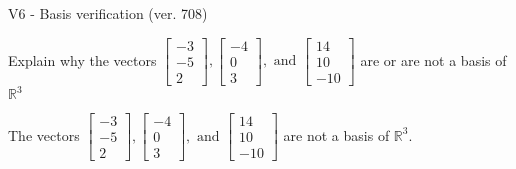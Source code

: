 \begin{exercise}
  \begin{exerciseTitle}V6 - Basis verification (ver. 708)\end{exerciseTitle}
  \begin{exerciseStatement}
    Explain why the vectors \(\left[\begin{array}{r}
-3 \\
-5 \\
2
\end{array}\right] , \left[\begin{array}{r}
-4 \\
0 \\
3
\end{array}\right] , \text{ and } \left[\begin{array}{r}
14 \\
10 \\
-10
\end{array}\right]\) are or are not a basis of \(\mathbb{R}^3\)	


  \end{exerciseStatement}
  \begin{exerciseAnswer}
   The vectors \(\left[\begin{array}{r}
-3 \\
-5 \\
2
\end{array}\right] , \left[\begin{array}{r}
-4 \\
0 \\
3
\end{array}\right] , \text{ and } \left[\begin{array}{r}
14 \\
10 \\
-10
\end{array}\right]\) 
  	 are not  a basis of \(\mathbb{R}^3\).
  


  \end{exerciseAnswer}
\end{exercise}